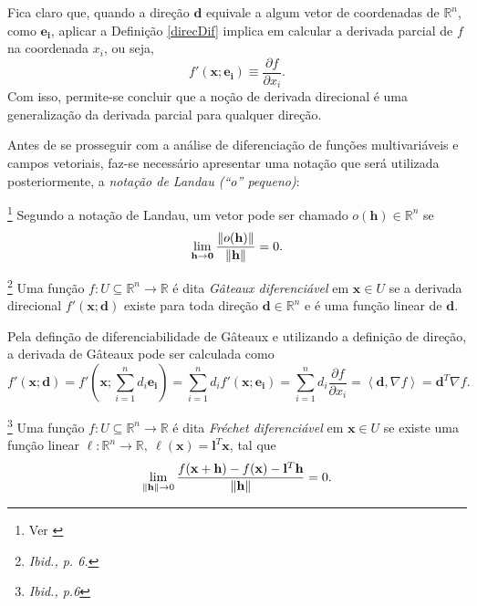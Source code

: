 Fica claro que, quando a dire\c{c}\~{a}o $\mathbf{d}$ equivale a algum vetor de coordenadas de $\mathbb{R}^{n}$, como $\mathbf{e_i}$, aplicar a Defini\c{c}\~{a}o \ref{direcDif} implica em calcular a derivada parcial de $f$ na coordenada $x_i$, ou seja,
\begin{equation*}
f'(\mathbf{x};\mathbf{e_i}) \equiv \frac{\partial f}{\partial x_i}.
\end{equation*}
Com isso, permite-se concluir que a no\c{c}\~{a}o de derivada direcional \'{e} uma generaliza\c{c}\~{a}o da derivada parcial para qualquer dire\c{c}\~{a}o.

Antes de se prosseguir com a an\'{a}lise de diferencia\c{c}\~{a}o de fun\c{c}\~{o}es multivari\'{a}veis e campos vetoriais, faz-se necess\'{a}rio apresentar uma nota\c{c}\~{a}o que ser\'{a} utilizada posteriormente, a \textit{nota\c{c}\~{a}o de Landau (``o'' pequeno)}:

\begin{definition}\footnote{Ver \cite[p. 6]{guller}}
Segundo a nota\c{c}\~{a}o de Landau, um vetor pode ser chamado $o(\mathbf{h}) \in \mathbb{R}^{n}$ se
\begin{equation*}
\lim_{\mathbf{h} \to \mathbf{0}} \frac{\left\lVert o(\mathbf{h})\right\rVert}{\left\lVert\mathbf{h}\right\rVert} = 0.
\end{equation*}
\end{definition}

\begin{definition}\label{gateauxDef}\footnote{\textit{Ibid., p. 6.}}
Uma fun\c{c}\~{a}o $f: U \subseteq \mathbb{R}^{n} \to \mathbb{R}$ \'{e} dita \textit{G\^{a}teaux diferenci\'{a}vel} em $\mathbf{x} \in U$ se a derivada direcional $f'(\mathbf{x};\mathbf{d})$ existe para toda dire\c{c}\~{a}o $\mathbf{d} \in \mathbb{R}^{n}$ e \'{e} uma fun\c{c}\~{a}o linear de $\mathbf{d}$.
\end{definition}

Pela defin\c{c}\~{a}o de diferenciabilidade de G\^{a}teaux e utilizando a defini\c{c}\~{a}o de dire\c{c}\~{a}o, a derivada de G\^{a}teaux pode ser calculada como
\begin{equation}\label{gateauxCalc}
f'(\mathbf{x};\mathbf{d}) = f'(\mathbf{x};\sum_{i=1}^{n}d_i\mathbf{e_i}) = \sum_{i=1}^{n} d_i f'(\mathbf{x};\mathbf{e_i}) = \sum_{i = 1}^{n} d_i \frac{\partial f}{\partial x_i} = \left\langle \mathbf{d},\nabla f \right\rangle = \mathbf{d}^T \nabla f.
\end{equation}

\begin{definition}\label{frechetDef}\footnote{\textit{Ibid., p.6}}
Uma fun\c{c}\~{a}o $f: U \subseteq \mathbb{R}^{n} \to \mathbb{R}$ \'{e} dita \textit{Fr\'{e}chet diferenci\'{a}vel} em $\mathbf{x} \in U$ se existe uma fun\c{c}\~{a}o linear $\ell: \mathbb{R}^{n} \to \mathbb{R},~\ell(\mathbf{x}) = \mathbf{l}^T\mathbf{x}$, tal que
\begin{equation*}
\lim_{\left\lVert\mathbf{h}\right\rVert \to 0} \frac{f(\mathbf{x} + \mathbf{h}) - f(\mathbf{x}) - \mathbf{l}^T\mathbf{h}}{\left\lVert\mathbf{h}\right\rVert} = 0.
\end{equation*}
\end{definition}


